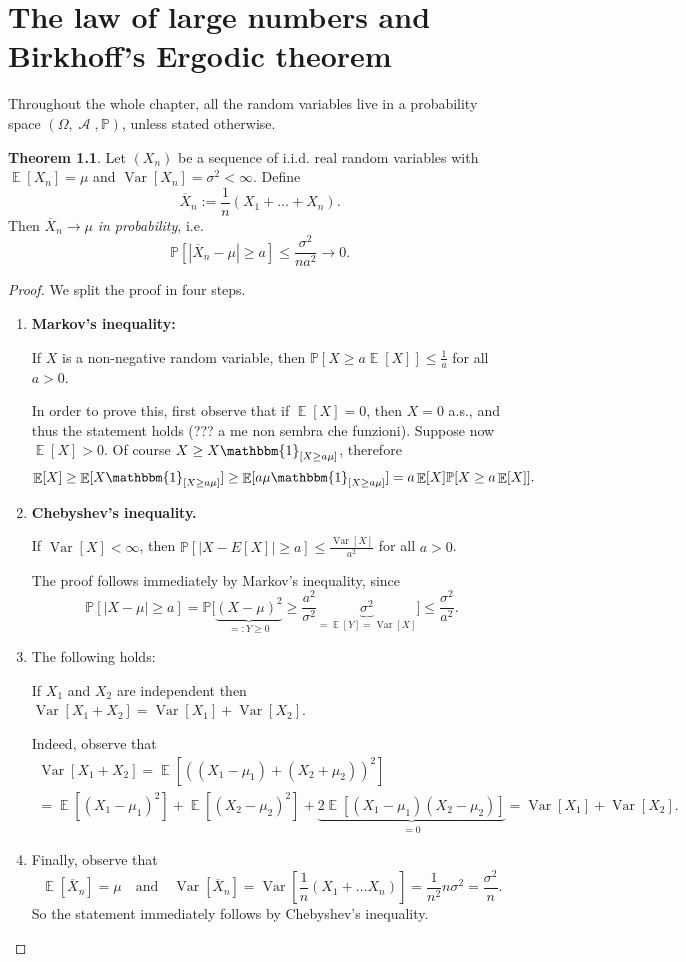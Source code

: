 \documentclass[12pt,a4paper]{report}
\theoremstyle{definition}
\newtheorem{theorem}{Theorem}[chapter] %
\theoremstyle{num.custom-title}
\DeclareMathOperator{\A}{\mathcal{A}}
\DeclareMathOperator{\E}{\mathbb{E}}
\DeclareMathOperator{\Var}{Var}
\newcommand{\ol}{\overline}
\renewcommand{\1}{\mathbbm{1}}
\renewcommand{\P}{\mathbb{P}}
\begin{document}
\chapter{The law of large numbers and Birkhoff's Ergodic theorem}

Throughout the whole chapter, all the random variables live in a probability space $(\Omega,\A,\P)$, unless stated otherwise.

\begin{theorem}
Let $(X_n)$ be a sequence of i.i.d. real random variables with $\E[X_n]=\mu$ and $\Var[X_n]=\sigma^2<\infty$. Define
\[
\ol{X}_n := \frac{1}{n}(X_1 + \ldots + X_n).
\]
Then $\ol{X}_n \to \mu$ \emph{in probability}, i.e.
\[
\P[|\ol{X}_n - \mu| \geq a] \leq \frac{\sigma^2}{na^2} \to 0.
\]
\begin{proof}
We split the proof in four steps.
\begin{enumerate}
\item \textbf{Markov's inequality:}
\begin{center}
If $X$ is a non-negative random variable, then $\P[X \geq a\E[X]] \leq \frac{1}{a}$ for all $a>0$.
\end{center}
In order to prove this, first observe that if $\E[X] = 0$, then $X=0$ a.s., and thus the statement holds (??? a me non sembra che funzioni). Suppose now $\E[X]>0$. Of course $X \geq X \1_{[X \geq a\mu]}$, therefore
\[
\E[X] \geq \E[X \1_{[X \geq a\mu]}] \geq \E[a \mu \1_{[X \geq a\mu]}] = a \E[X] \P[X \geq a \E[X]].
\]
\item \textbf{Chebyshev's inequality.}
\begin{center}
If $\Var[X]<\infty$, then $\displaystyle\P[|X-E[X]| \geq a] \leq \frac{\Var[X]}{a^2}$ for all $a>0$.
\end{center}
The proof follows immediately by Markov's inequality, since
\[
\P[|X-\mu| \geq a] = \P \bigg[ \underbrace{(X-\mu)^2}_{=: Y \geq 0} \geq \frac{a^2}{\sigma^2} \underbrace{\sigma^2}_{= \E[Y] = \Var[X]} \bigg] \leq \frac{\sigma^2}{a^2}.
\]
\item The following holds:
\begin{center}
If $X_1$ and $X_2$ are independent then $\Var[X_1+X_2] = \Var[X_1]+\Var[X_2]$.
\end{center}
Indeed, observe that
\begin{multline*}
\Var[X_1+X_2] = \E[((X_1-\mu_1)+(X_2+\mu_2))^2] \\
= \E[(X_1-\mu_1)^2] + \E[(X_2-\mu_2)^2] + \underbrace{2\E[(X_1-\mu_1)(X_2-\mu_2)]}_{=0} = \Var[X_1] + \Var[X_2].
\end{multline*}
\item Finally, observe that
\[
\E[\ol{X}_n] = \mu \quad \text{and} \quad
\Var[\ol{X}_n] = \Var \left[ \frac{1}{n}(X_1 + \ldots X_n) \right] = \frac{1}{n^2} n \sigma^2 = \frac{\sigma^2}{n}.
\]
So the statement immediately follows by Chebyshev's inequality.
\end{enumerate}
\end{proof}
\end{theorem}
\end{document}
